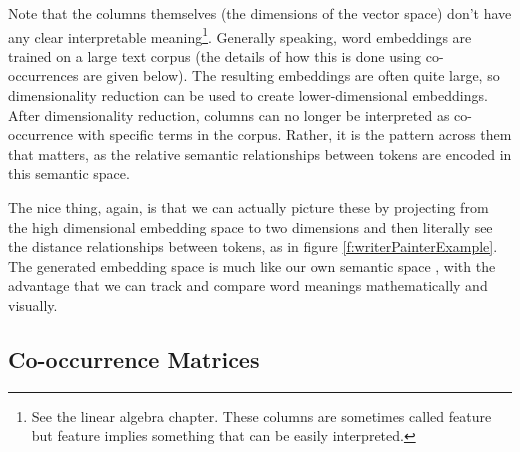 Note that the columns themselves (the dimensions of the vector space) don't have any clear interpretable meaning\footnote{See the linear algebra chapter. These columns are sometimes called feature but feature implies something that can be easily interpreted.}. Generally speaking, word embeddings are trained on a large text corpus (the details of how this is done using co-occurrences are given below). The resulting embeddings are often quite large, so dimensionality reduction can be used to create lower-dimensional embeddings. After dimensionality reduction, columns can no longer be interpreted as co-occurrence with specific terms in the corpus. Rather, it is the pattern across them that matters, as the relative semantic relationships between tokens are encoded in this semantic space. 

The nice thing, again, is that we can actually picture these by projecting from the high dimensional embedding space to two dimensions and then literally see the distance relationships between tokens, as in figure \ref{f:writerPainterExample}. The generated embedding space is much like our own semantic space \cite{lewis2019distributional}, with the advantage that we can track and compare word meanings mathematically and visually.


\subsection{Co-occurrence Matrices}



